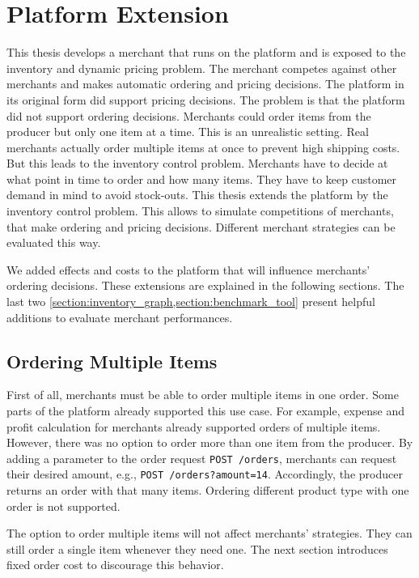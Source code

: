 
\chapter{\pricewars Platform Extension}

This thesis develops a merchant that runs on the \pricewars platform and is exposed to the inventory and dynamic pricing problem.
The merchant competes against other merchants and makes automatic ordering and pricing decisions.
The platform in its original form did support pricing decisions.
The problem is that the platform did not support ordering decisions.
Merchants could order items from the producer but only one item at a time.
This is an unrealistic setting.
Real merchants actually order multiple items at once to prevent high shipping costs.
But this leads to the inventory control problem.
Merchants have to decide at what point in time to order and how many items.
They have to keep customer demand in mind to avoid stock-outs.
This thesis extends the \pricewars platform by the inventory control problem.
This allows to simulate competitions of merchants, that make ordering and pricing decisions.
Different merchant strategies can be evaluated this way.

We added effects and costs to the platform that will influence merchants' ordering decisions.
These extensions are explained in the following sections.
The last two \cref{section:inventory_graph,section:benchmark_tool} present helpful additions to evaluate merchant performances.

\section{Ordering Multiple Items}
\label{section:multiple_items}
First of all, merchants must be able to order multiple items in one order.
Some parts of the platform already supported this use case.
For example, expense and profit calculation for merchants already supported orders of multiple items.
However, there was no option to order more than one item from the producer.
By adding a parameter to the order request \texttt{POST /orders}, merchants can request their desired amount, e.g., \texttt{POST /orders?amount=14}.
Accordingly, the producer returns an order with that many items.
Ordering different product type with one order is not supported.

The option to order multiple items will not affect merchants' strategies.
They can still order a single item whenever they need one.
The next section introduces fixed order cost to discourage this behavior.

